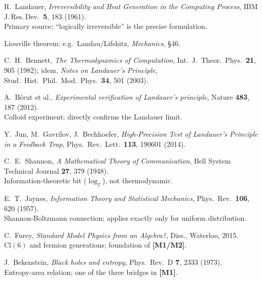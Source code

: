 \begin{description}[leftmargin=3.5em,style=sameline,itemsep=0.4em]

\item[{[B1]}] R.~Landauer, \textit{Irreversibility and Heat Generation in the
  Computing Process}, IBM J.\,Res.\,Dev.\ \textbf{5}, 183 (1961). \\
  Primary source; ``logically irreversible'' is the precise formulation.

\item[{[B2]}] Liouville theorem: e.g.\ Landau/Lifshitz,
  \textit{Mechanics}, §46.

\item[{[B3]}] C.~H.~Bennett, \textit{The Thermodynamics of Computation},
  Int.\ J.\ Theor.\ Phys.\ \textbf{21}, 905 (1982); idem,
  \textit{Notes on Landauer's Principle},
  Stud.\ Hist.\ Phil.\ Mod.\ Phys.\ \textbf{34}, 501 (2003).

\item[{[B4]}] A.~Bérut et al., \textit{Experimental verification of
  Landauer's principle}, Nature \textbf{483}, 187 (2012). \\
  Colloid experiment; directly confirms the Landauer limit.

\item[{[B5]}] Y.~Jun, M.~Gavrilov, J.~Bechhoefer,
  \textit{High-Precision Test of Landauer's Principle in a Feedback Trap},
  Phys.\ Rev.\ Lett.\ \textbf{113}, 190601 (2014).

\item[{[B6]}] C.~E.~Shannon, \textit{A Mathematical Theory of Communication},
  Bell System Technical Journal \textbf{27}, 379 (1948). \\
  Information-theoretic bit ($\log_2$), not thermodynamic.

\item[{[B7]}] E.~T.~Jaynes, \textit{Information Theory and Statistical Mechanics},
  Phys.\ Rev.\ \textbf{106}, 620 (1957). \\
  Shannon-Boltzmann connection; applies exactly only for uniform distribution.

\item[{[B8]}] C.~Furey, \textit{Standard Model Physics from an Algebra?},
  Diss., Waterloo, 2015. \\
  $\mathrm{Cl}(6)$ and fermion generations; foundation of \textbf{[M1/M2]}.

\item[{[B9]}] J.~Bekenstein, \textit{Black holes and entropy},
  Phys.\ Rev.\ D \textbf{7}, 2333 (1973). \\
  Entropy-area relation; one of the three bridges in \textbf{[M1]}.


\end{description}
